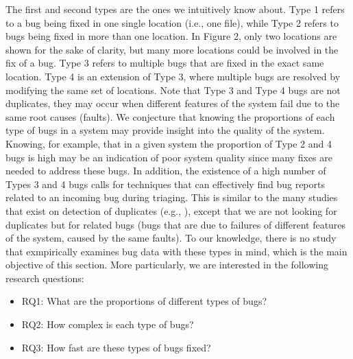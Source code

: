 The first and second types are the ones we intuitively know
about.
Type 1 refers to a bug being fixed in one single location (i.e., one file), while Type 2 refers to bugs being fixed in more than one location.
In Figure 2, only two locations are shown for the sake of clarity, but many more locations could be involved in the fix of a bug.
Type 3 refers to multiple bugs that are fixed in the exact same location.
Type 4 is an extension of Type 3, where multiple bugs are resolved by modifying the same set of locations.
Note that Type 3 and Type 4 bugs are not duplicates, they may occur when different features of the system fail due to the same root causes (faults).
We conjecture that knowing the proportions of each type of bugs in a system may provide insight into the quality of the system.
Knowing, for example, that in a given system the proportion of Type 2 and 4 bugs is high may be an indication of poor system quality since many fixes are needed to address these bugs.
In addition, the existence of a high number of Types 3 and 4 bugs calls for techniques that can effectively find bug reports related to an incoming bug during triaging.
This is similar to the many studies that exist on detection of duplicates (e.g., \cite{Runeson2007,Sun2010,Nguyen2012}), except that we are not looking for duplicates but for related bugs (bugs that are due to failures of different features of the system, caused by the same faults).
To our knowledge, there is no study that exmpirically examines bug data with these types in mind, which is the main objective of this section.
More particularly, we are interested in the following research questions:

\begin{itemize}
	\item RQ1: What are the proportions of different types of bugs?
	\item RQ2: How complex is each type of bugs?
	\item RQ3: How fast are these types of bugs fixed?
\end{itemize}
